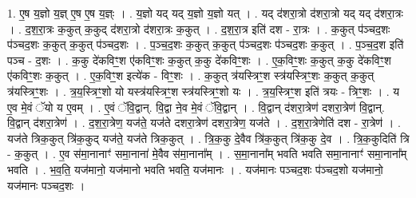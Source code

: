 \documentclass[17pt]{extarticle}
\begin{document}
1. ए॒ष य॒ज्ञो य॒ज्ञ् ए॒ष ए॒ष य॒ज्ञ्ः । . य॒ज्ञो यद् यद् य॒ज्ञो य॒ज्ञो यत् । . यद् द॑शरा॒त्रो द॑शरा॒त्रो यद् यद् द॑शरा॒त्रः । . द॒श॒रा॒त्रः क॒कुत् क॒कुद् द॑शरा॒त्रो द॑शरा॒त्रः क॒कुत् । . द॒श॒रा॒त्र इति॑ दश - रा॒त्रः । . क॒कुत् प॑ञ्चद॒शः प॑ञ्चद॒शः क॒कुत् क॒कुत् प॑ञ्चद॒शः । . प॒ञ्च॒द॒शः क॒कुत् क॒कुत् प॑ञ्चद॒शः प॑ञ्चद॒शः क॒कुत् । . प॒ञ्च॒द॒श इति॑ पञ्च - द॒शः । . क॒कु दे॑कविꣳ॒॒श ए॑कविꣳ॒॒शः क॒कुत् क॒कु दे॑कविꣳ॒॒शः । . ए॒क॒विꣳ॒॒शः क॒कुत् क॒कु दे॑कविꣳ॒॒श ए॑कविꣳ॒॒शः क॒कुत् । . ए॒क॒विꣳ॒॒श इत्ये॑क - विꣳ॒॒शः । . क॒कुत् त्र॑यस्त्रिꣳ॒॒श स्त्र॑यस्त्रिꣳ॒॒शः क॒कुत् क॒कुत् त्र॑यस्त्रिꣳ॒॒शः । . त्र॒य॒स्त्रिꣳ॒॒शो यो यस्त्र॑यस्त्रिꣳ॒॒श स्त्र॑यस्त्रिꣳ॒॒शो यः । . त्र॒य॒स्त्रिꣳ॒॒श इति॑ त्रयः - त्रिꣳ॒॒शः । . य ए॒व मे॒वं ॅयो य ए॒वम् । . ए॒वं ॅवि॒द्वान्. वि॒द्वा ने॒व मे॒वं ॅवि॒द्वान् । . वि॒द्वान् द॑शरा॒त्रेण॑ दशरा॒त्रेण॑ वि॒द्वान्. वि॒द्वान् द॑शरा॒त्रेण॑ । . द॒श॒रा॒त्रेण॒ यज॑ते॒ यज॑ते दशरा॒त्रेण॑ दशरा॒त्रेण॒ यज॑ते । . द॒श॒रा॒त्रेणेति॑ दश - रा॒त्रेण॑ । . यज॑ते त्रिक॒कुत् त्रि॑क॒कुद् यज॑ते॒ यज॑ते त्रिक॒कुत् । . त्रि॒क॒कु दे॒वैव त्रि॑क॒कुत् त्रि॑क॒कु दे॒व । . त्रि॒क॒कुदिति॑ त्रि - क॒कुत् । . ए॒व स॑मा॒नानाꣳ॑ समा॒नाना॑ मे॒वैव स॑मा॒नाना᳚म् । . स॒मा॒नाना᳚म् भवति भवति समा॒नानाꣳ॑ समा॒नाना᳚म् भवति । . भ॒व॒ति॒ यज॑मानो॒ यज॑मानो भवति भवति॒ यज॑मानः । . यज॑मानः पञ्चद॒शः प॑ञ्चद॒शो यज॑मानो॒ यज॑मानः पञ्चद॒शः । \newline
\end{document}
